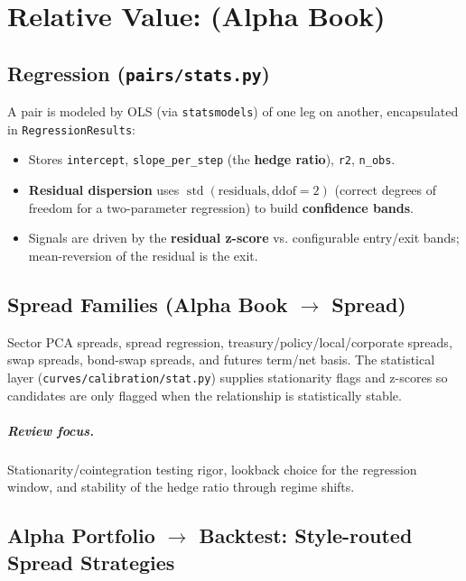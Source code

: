 \chapter{Relative Value: (Alpha Book)}

\section{Regression (\texttt{pairs/stats.py})}

A pair is modeled by OLS (via \texttt{statsmodels}) of one leg on another, encapsulated in
\texttt{RegressionResults}:

\begin{itemize}
\item Stores \texttt{intercept}, \texttt{slope\_per\_step} (the \textbf{hedge ratio}), \texttt{r2}, \texttt{n\_obs}.
\item \textbf{Residual dispersion} uses $\operatorname{std}(\text{residuals}, \mathrm{ddof}=2)$ (correct degrees of freedom for a two-parameter regression) to build \textbf{confidence bands}.
\item Signals are driven by the \textbf{residual z-score} vs. configurable entry/exit bands; mean-reversion of the residual is the exit.
\end{itemize}

\section{Spread Families (Alpha Book $\rightarrow$ Spread)}

Sector PCA spreads, spread regression, treasury/policy/local/corporate spreads, swap
spreads, bond-swap spreads, and futures term/net basis. The statistical layer
(\texttt{curves/calibration/stat.py}) supplies stationarity flags and z-scores so candidates
are only flagged when the relationship is statistically stable.

\paragraph{Review focus.}
Stationarity/cointegration testing rigor, lookback choice for the regression window,
and stability of the hedge ratio through regime shifts.

\section{Alpha Portfolio $\rightarrow$ Backtest: Style-routed Spread Strategies}

